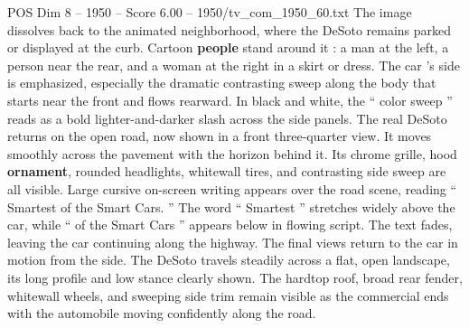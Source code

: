 \begin{textsample}{POS Dim 8 – 1950 – Score 6.00 – 1950/tv\_com\_1950\_60.txt}
The image dissolves back to the animated neighborhood, where the DeSoto remains parked or displayed at the curb.
Cartoon \textbf{people} stand around it : a man at the left, a person near the rear, and a woman at the right in a skirt or dress.
The car ’s side is emphasized, especially the dramatic contrasting sweep along the body that starts near the front and flows rearward.
In black and white, the “ color sweep ” reads as a bold lighter-and-darker slash across the side panels.
The real DeSoto returns on the open road, now shown in a front three-quarter view.
It moves smoothly across the pavement with the horizon behind it.
Its chrome grille, hood \textbf{ornament}, rounded headlights, whitewall tires, and contrasting side sweep are all visible.
Large cursive on-screen writing appears over the road scene, reading “ Smartest of the Smart Cars. ” The word “ Smartest ” stretches widely above the car, while “ of the Smart Cars ” appears below in flowing script.
The text fades, leaving the car continuing along the highway.
The final views return to the car in motion from the side.
The DeSoto travels steadily across a flat, open landscape, its long profile and low stance clearly shown.
The hardtop roof, broad rear fender, whitewall wheels, and sweeping side trim remain visible as the commercial ends with the automobile moving confidently along the road.

\end{textsample}
